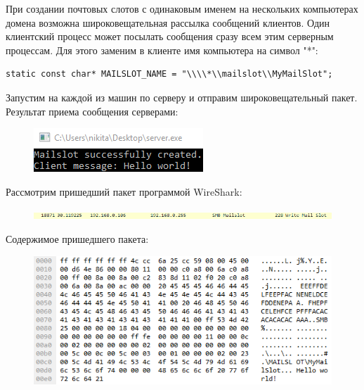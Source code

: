 \documentclass[14pt,a4paper,report]{report}
\begin{document}
При создании почтовых слотов с одинаковым именем на нескольких компьютерах домена возможна широковещательная рассылка сообщений клиентов. Один клиентский процесс может посылать сообщения сразу всем этим серверным процессам. Для этого заменим в клиенте имя компьютера на символ "*":

\begin{verbatim}
static const char* MAILSLOT_NAME = "\\\\*\\mailslot\\MyMailSlot";
\end{verbatim}

Запустим на каждой из машин по серверу и отправим широковещательный пакет. Результат приема сообщения серверами:

\begin{figure}[h!]
	\centering
	\includegraphics[scale = 1.1]{images/p6_3_result.png}
	
	\caption{}
	\label{image:30}
\end{figure}

Рассмотрим пришедший пакет программой WireShark:

\begin{figure}[h!]
	\centering
	\includegraphics[scale = 0.85]{images/p6_3_wireshark_ip.png}
	
	\caption{}
	\label{image:31}
\end{figure}

Содержимое пришедшего пакета:

\begin{figure}[h!]
	\centering
	\includegraphics[scale = 0.85]{images/p6_3_wireshark_package.png}
	
	\caption{}
	\label{image:32}
\end{figure}
\end{document}
